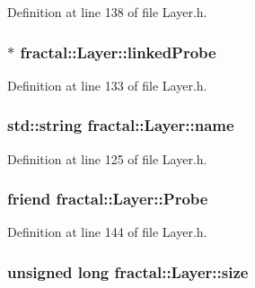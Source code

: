 Definition at line 138 of file Layer.\+h.

\hypertarget{classfractal_1_1Layer_a2c58f72836357e0ab4b16e7e2ee5b4b7}{
\subsubsection[{linked\+Probe}]{$\ast$ fractal\+::\+Layer\+::linked\+Probe\hspace{0.3cm}{\ttfamily [protected]}}}\label{classfractal_1_1Layer_a2c58f72836357e0ab4b16e7e2ee5b4b7}


Definition at line 133 of file Layer.\+h.

\hypertarget{classfractal_1_1Layer_a657c8772dd166aca9aafc082850c1c78}{
\subsubsection[{name}]{\setlength{\rightskip}{0pt plus 5cm}std\+::string fractal\+::\+Layer\+::name\hspace{0.3cm}{\ttfamily [protected]}}}\label{classfractal_1_1Layer_a657c8772dd166aca9aafc082850c1c78}


Definition at line 125 of file Layer.\+h.

\hypertarget{classfractal_1_1Layer_af01de55572c632f393ec441fc4c244f5}{
\subsubsection[{Probe}]{\setlength{\rightskip}{0pt plus 5cm}friend fractal\+::\+Layer\+::\+Probe\hspace{0.3cm}{\ttfamily [protected]}}}\label{classfractal_1_1Layer_af01de55572c632f393ec441fc4c244f5}


Definition at line 144 of file Layer.\+h.

\hypertarget{classfractal_1_1Layer_ad772ed1139baedba2bb70b7f235f32d5}{
\subsubsection[{size}]{\setlength{\rightskip}{0pt plus 5cm}unsigned long fractal\+::\+Layer\+::size\hspace{0.3cm}{\ttfamily [protected]}}}\label{classfractal_1_1Layer_ad772ed1139baedba2bb70b7f235f32d5}


